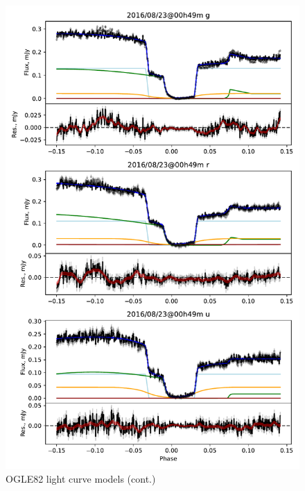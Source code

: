 \begin{figure}
    \centering
    \includegraphics[width=\textwidth]{figures/results/OGLE82/OGLE82_2.pdf}
    \caption{OGLE82 light curve models (cont.)}
    \label{fig:OGLE82 all light curves cont 1}
\end{figure}
